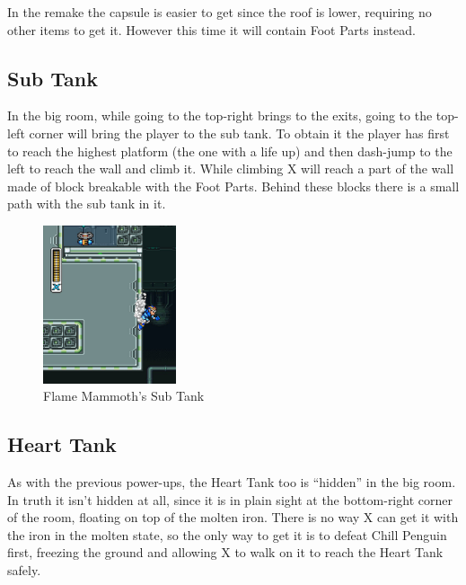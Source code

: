 In the \mhx remake the capsule is easier to get since the roof is lower, requiring no other items to get it. However this time it will contain Foot Parts instead.

\subsection{Sub Tank}
In the big room, while going to the top-right brings to the exits, going to the top-left corner will bring the player to the sub tank. To obtain it the player has first to reach the highest platform (the one with a life up) and then dash-jump to the left to reach the wall and climb it. While climbing X will reach a part of the wall made of block breakable with the Foot Parts. Behind these blocks there is a small path with the sub tank in it.
\begin{figure}[h]
	\centering
	\includegraphics[width=0.35\textwidth]{figures/X1/Flame_mammoth/Flame_tank.jpg}
	\caption{Flame Mammoth's Sub Tank}
\end{figure}



\subsection{Heart Tank}
As with the previous power-ups, the Heart Tank too is ``hidden'' in the big room. In truth it isn't hidden at all, since it is in plain sight at the bottom-right corner of the room, floating on top of the molten iron. There is no way X can get it with the iron in the molten state, so the only way to get it is to defeat Chill Penguin first, freezing the ground and allowing X to walk on it to reach the Heart Tank safely.

